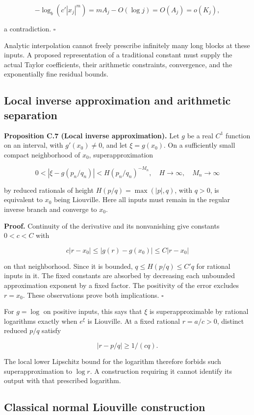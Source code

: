 \documentclass[11pt,a4paper]{article}
\begin{document}
\[
-\log_b(c'|x_j|^m)=mA_j-O(\log j)=O(A_j)=o(K_j),
\]

a contradiction. \(\square\)

Analytic interpolation cannot freely prescribe infinitely many long
blocks at these inputs. A proposed representation of a traditional
constant must supply the actual Taylor coefficients, their arithmetic
constraints, convergence, and the exponentially fine residual bounds.

\subsection{Local inverse approximation and arithmetic
separation}\label{local-inverse-approximation-and-arithmetic-separation}

\textbf{Proposition C.7 (Local inverse approximation).} Let \(g\) be a
real \(C^1\) function on an interval, with \(g'(x_0)\ne0\), and let
\(\xi=g(x_0)\). On a sufficiently small compact neighborhood of \(x_0\),
superapproximation

\[
0< |\xi-g(p_n/q_n)|< H(p_n/q_n)^{-M_n},\quad
H\to\infty,\quad M_n\to\infty
\]

by reduced rationals of height \(H(p/q)=\max(|p|,q)\), with \(q>0\), is
equivalent to \(x_0\) being Liouville. Here all inputs must remain in
the regular inverse branch and converge to \(x_0\).

\textbf{Proof.} Continuity of the derivative and its nonvanishing give
constants \(0< c< C\) with

\[
c|r-x_0|\le |g(r)-g(x_0)|\le C|r-x_0|
\]

on that neighborhood. Since it is bounded, \(q\le H(p/q)\le C' q\) for
rational inputs in it. The fixed constants are absorbed by decreasing
each unbounded approximation exponent by a fixed factor. The positivity
of the error excludes \(r=x_0\). These observations prove both
implications. \(\square\)

For \(g=\log\) on positive inputs, this says that \(\xi\) is
superapproximable by rational logarithms exactly when \(e^\xi\) is
Liouville. At a fixed rational \(r=a/c>0\), distinct reduced \(p/q\)
satisfy

\[
|r-p/q|\ge1/(cq).
\]

The local lower Lipschitz bound for the logarithm therefore forbids such
superapproximation to \(\log r\). A construction requiring it cannot
identify its output with that prescribed logarithm.

\subsection{Classical normal Liouville
construction}\label{classical-normal-liouville-construction}
\end{document}

